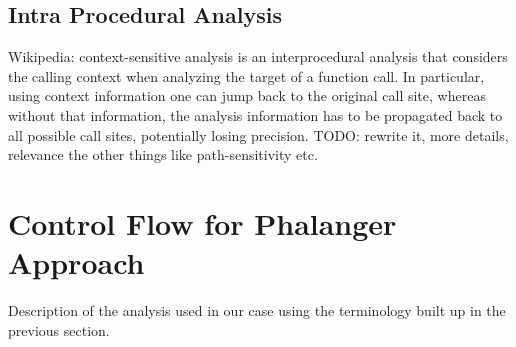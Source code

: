         \subsection{Intra Procedural Analysis}
        Wikipedia: context-sensitive analysis is an interprocedural analysis that considers the calling context when analyzing the target of a function call. In particular, using context information one can jump back to the original call site, whereas without that information, the analysis information has to be propagated back to all possible call sites, potentially losing precision.        
        TODO: rewrite it, more details, relevance the other things like path-sensitivity etc.
    
    \section{Control Flow for Phalanger Approach}
        Description of the analysis used in our case using the terminology 
        built up in the previous section.
